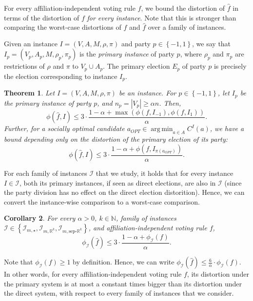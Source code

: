 \documentclass[letterpaper]{article} %
\newtheorem{theorem}{Theorem}
\newtheorem{corollary}[theorem]{Corollary}
\theoremstyle{definition}
\newcommand{\set}[1]{\left\{#1\right\}}
\renewcommand{\hat}{\widehat}
\DeclareMathOperator*{\argmin}{\arg\,\min}
\newcommand{\bbN}{\mathbb{N}}
\newcommand{\bbR}{\mathbb{R}}
\newcommand{\calI}{\mathcal{I}}
\newcommand{\pleft}{-1}
\newcommand{\pright}{1}
\newcommand{\all}{\star}
\newcommand{\sep}{\textrm{sep-}}
\newcommand{\euc}[1]{\bbR^{#1}}
\newcommand{\eucsep}[1]{\sep\euc{#1}}
\newcommand{\I}{\calI}
\begin{document}
For every affiliation-independent voting rule $f$, we bound the distortion of $\hat{f}$ in terms of the distortion of $f$ \emph{for every instance}. Note that this is stronger than comparing the worst-case distortions of $f$ and $\hat{f}$ over a family of instances.

Given an instance $I = (V,A,M,\rho,\pi)$ and party $p \in \set{\pleft,\pright}$, we say that $I_p = (V_p,A_p,M,\rho_p,\pi_p)$ is the \emph{primary instance} of party $p$, where $\rho_p$ and $\pi_p$ are restrictions of $\rho$ and $\pi$ to $V_p \cup A_p$. The primary election $E_p$ of party $p$ is precisely the election corresponding to instance $I_p$.


\begin{theorem}
	Let $I = (V,A,M,\rho,\pi)$ be an instance. For $p \in \set{\pleft,\pright}$, let $I_p$ be the primary instance of party $p$, and $n_p = |V_p| \ge \alpha n$. Then,
	$$
	\phi(\hat{f},I) \le 3 \cdot \frac{1-\alpha+\max(\phi(f,I_{\pleft}),\phi(f,I_{\pright}))}{\alpha}.
	$$
	Further, for a socially optimal candidate $a_{OPT} \in \argmin_{a \in A} C^I(a)$, we have a bound depending only on the distortion of the primary election of its party:
	$$
	\phi(\hat{f},I) \le 3 \cdot \frac{1-\alpha+\phi(f,I_{\pi(a_{OPT})})}{\alpha}.
	$$

\label{thm:large-primaries-good}
\end{theorem}

For each family of instances $\I$ that we study, it holds that for every instance $I \in \calI$, both its primary instances, if seen as direct elections, are also in $\I$ (since the party division has no effect on the direct election distorition). Hence, we can convert the instance-wise comparison to a worst-case comparison.

\begin{corollary}
\label{cor:large-primaries-good}
	For every $\alpha > 0$, $k \in \bbN$, family of instances $\I \in \set{\I_{m,\all},\I_{m,\euc{k}},\I_{m,\eucsep{k}}}$, and affiliation-independent voting rule $f$,
	$$
	\phi_{\I}(\hat{f}) \le 3\cdot \frac{1-\alpha+\phi_{\I}(f)}{\alpha}.
	$$
\end{corollary}

Note that $\phi_{\I}(f) \ge 1$ by definition. Hence, we can write $\phi_{\I}(\hat{f}) \le \frac{6}{\alpha} \cdot \phi_{\I}(f)$. In other words, for every affiliation-independent voting rule $f$, its distortion under the primary system is at most a constant times bigger than its distortion under the direct system, with respect to every family of instances that we consider. %
\end{document}
